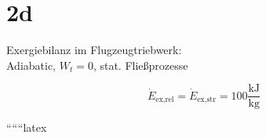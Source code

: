 

\section*{2d}

Exergiebilanz im Flugzeugtriebwerk: \\
Adiabatic, \( W_t = 0 \), stat. Fließprozesse

\[
\dot{E}_{\text{ex,rel}} = \dot{E}_{\text{ex,str}} = 100 \frac{\text{kJ}}{\text{kg}}
\]

``````latex